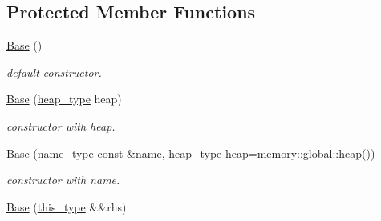 \subsection*{Protected Member Functions}
\begin{DoxyCompactItemize}
\item 
\hypertarget{classhryky_1_1reduction_1_1_base_a5ffe0568374d8b9b4c4ec32953fd6453}{\hyperlink{classhryky_1_1reduction_1_1_base_a5ffe0568374d8b9b4c4ec32953fd6453}{Base} ()}\label{classhryky_1_1reduction_1_1_base_a5ffe0568374d8b9b4c4ec32953fd6453}

\begin{DoxyCompactList}\small\item\em default constructor. \end{DoxyCompactList}\item 
\hypertarget{classhryky_1_1reduction_1_1_base_ae295e83458b0cc22bd9e29c31aa4cddc}{\hyperlink{classhryky_1_1reduction_1_1_base_ae295e83458b0cc22bd9e29c31aa4cddc}{Base} (\hyperlink{classhryky_1_1memory_1_1heap_1_1_base}{heap\-\_\-type} heap)}\label{classhryky_1_1reduction_1_1_base_ae295e83458b0cc22bd9e29c31aa4cddc}

\begin{DoxyCompactList}\small\item\em constructor with heap. \end{DoxyCompactList}\item 
\hypertarget{classhryky_1_1reduction_1_1_base_ae65e57f7e970a9e1db71cd2c507523bb}{\hyperlink{classhryky_1_1reduction_1_1_base_ae65e57f7e970a9e1db71cd2c507523bb}{Base} (\hyperlink{namespacehryky_1_1reduction_ac686c30a4c8d196bbd0f05629a6b921f}{name\-\_\-type} const \&\hyperlink{classhryky_1_1reduction_1_1_base_a842569265d741905eb8a353d3935f1d1}{name}, \hyperlink{classhryky_1_1memory_1_1heap_1_1_base}{heap\-\_\-type} heap=\hyperlink{namespacehryky_1_1memory_1_1global_a6fc6103f67c837aa0f39b359588409cd}{memory\-::global\-::heap}())}\label{classhryky_1_1reduction_1_1_base_ae65e57f7e970a9e1db71cd2c507523bb}

\begin{DoxyCompactList}\small\item\em constructor with name. \end{DoxyCompactList}\item 
\hypertarget{classhryky_1_1reduction_1_1_base_a09ce91786e009adb52fcf031bdb249e6}{\hyperlink{classhryky_1_1reduction_1_1_base_a09ce91786e009adb52fcf031bdb249e6}{Base} (\hyperlink{classhryky_1_1reduction_1_1_base_af02a7dee6042080b7380afd2f9500a42}{this\-\_\-type} \&\&rhs)}\label{classhryky_1_1reduction_1_1_base_a09ce91786e009adb52fcf031bdb249e6}


\end{DoxyCompactItemize}
